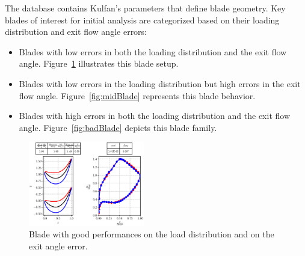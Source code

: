 \documentclass[11pt,a4paper,twocolumn]{article}
\begin{document}

The database contains Kulfan's parameters that define blade geometry. Key blades of interest for initial analysis are categorized based on their loading distribution and exit flow angle errors:

\begin{itemize}
    \item Blades with low errors in both the loading distribution and the exit flow angle. Figure~\ref{fig:goodBlade} illustrates this blade setup.
    \item Blades with low errors in the loading distribution but high errors in the exit flow angle. Figure~\ref{fig:midBlade} represents this blade behavior.
    \item Blades with high errors in both the loading distribution and the exit flow angle. Figure~\ref{fig:badBlade} depicts this blade family.
\end{itemize}

\begin{figure}[!h]
    \centering
    \hspace*{-0.6cm}
    \includegraphics[width=0.45\textwidth]{./images/bladeVal0305.eps}
    \caption{Blade with good performances on the load distribution and on the exit angle error.}
    \label{fig:goodBlade}
\end{figure}
\end{document}
